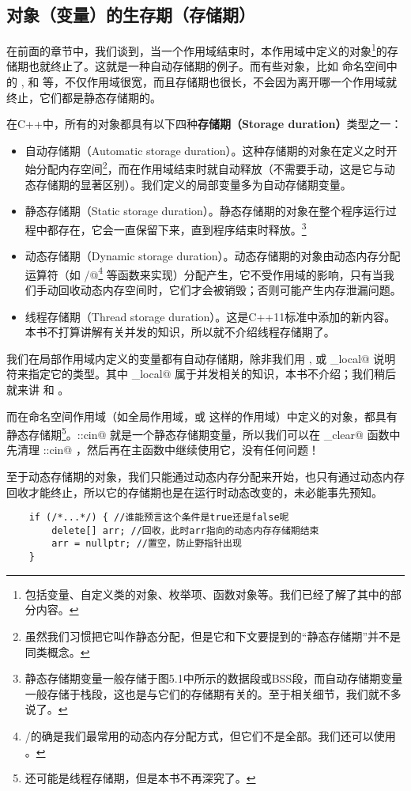\subsection*{对象（变量）的生存期（存储期）}
在前面的章节中，我们谈到，当一个作用域结束时，本作用域中定义的对象\footnote{包括变量、自定义类的对象、枚举项、函数对象等。我们已经了解了其中的部分内容。}的存储期也就终止了。这就是一种自动存储期的例子。而有些对象，比如 \lstinline@std@ 命名空间中的 \lstinline@cin@, \lstinline@cout@ 和 \lstinline@endl@ 等，不仅作用域很宽，而且存储期也很长，不会因为离开哪一个作用域就终止，它们都是静态存储期的。\par\pagebreak
在C++中，所有的对象都具有以下四种\textbf{存储期（Storage duration）}类型之一：
\begin{itemize}
    \item 自动存储期（Automatic storage duration）。这种存储期的对象在定义之时开始分配内存空间\footnote{虽然我们习惯把它叫作静态分配，但是它和下文要提到的``静态存储期''并不是同类概念。}，而在作用域结束时就自动释放（不需要手动，这是它与动态存储期的显著区别）。我们定义的局部变量多为自动存储期变量。
    \item 静态存储期（Static storage duration）。静态存储期的对象在整个程序运行过程中都存在，它会一直保留下来，直到程序结束时释放。\footnote{静态存储期变量一般存储于图5.1中所示的数据段或BSS段，而自动存储期变量一般存储于栈段，这也是与它们的存储期有关的。至于相关细节，我们就不多说了。}
    \item 动态存储期（Dynamic storage duration）。动态存储期的对象由动态内存分配运算符（如 \lstinline@new@/\lstinline@new[]@\footnote{\lstinline@new@/\lstinline@delete@ 的确是我们最常用的动态内存分配方式，但它们不是全部。我们还可以使用 \lstinline@malloc@。} 等函数来实现）分配产生，它不受作用域的影响，只有当我们手动回收动态内存空间时，它们才会被销毁；否则可能产生内存泄漏问题。
    \item 线程存储期（Thread storage duration）。这是C++11标准中添加的新内容。本书不打算讲解有关并发的知识，所以就不介绍线程存储期了。
\end{itemize}\par
我们在局部作用域内定义的变量都有自动存储期，除非我们用 \lstinline@static@, \lstinline@extern@ 或 \lstinline@thread_local@ 说明符来指定它的类型。其中 \lstinline@thread_local@ 属于并发相关的知识，本书不介绍；我们稍后就来讲 \lstinline@static@ 和 \lstinline@extern@。\par
而在命名空间作用域（如全局作用域，或 \lstinline@std@ 这样的作用域）中定义的对象，都具有静态存储期\footnote{还可能是线程存储期，但是本书不再深究了。}。\lstinline@std::cin@ 就是一个静态存储期变量，所以我们可以在 \lstinline@input_clear@ 函数中先清理 \lstinline@std::cin@ ，然后再在主函数中继续使用它，没有任何问题！\par
至于动态存储期的对象，我们只能通过动态内存分配来开始，也只有通过动态内存回收才能终止，所以它的存储期也是在运行时动态改变的，未必能事先预知。
\begin{lstlisting}
    if (/*...*/) { //谁能预言这个条件是true还是false呢
        delete[] arr; //回收，此时arr指向的动态内存存储期结束
        arr = nullptr; //置空，防止野指针出现
    }
\end{lstlisting}
